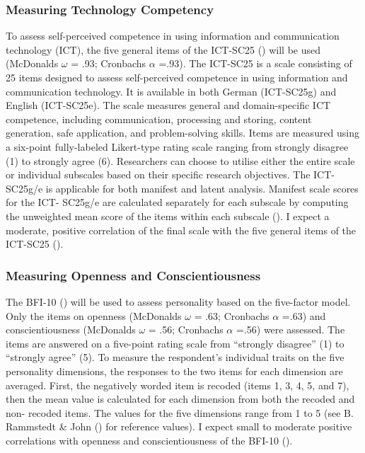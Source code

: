 \documentclass[
  12pt,
  a4paper,
  twoside]{article}
\begin{document}
\subsubsection{Measuring Technology Competency}\label{measuring-technology-competency}

To assess self-perceived competence in using information and
communication technology (ICT), the five general items of the ICT-SC25 () will be used (McDonalds \(\omega\) = .93; Cronbachs \(\alpha\) =.93). The ICT-SC25 is a scale consisting of 25 items designed to
assess self-perceived competence in using information and communication
technology. It is available in both German (ICT-SC25g) and English (ICT-SC25e). The
scale measures general and domain-specific ICT competence, including
communication, processing and storing, content generation, safe application, and
problem-solving skills. Items are measured using a six-point fully-labeled Likert-type
rating scale ranging from strongly disagree (1) to strongly agree (6). Researchers can choose to
utilise either the entire scale or individual subscales based on their specific research objectives. The ICT-SC25g/e
is applicable for both manifest and latent analysis. Manifest scale scores for the ICT-
SC25g/e are calculated separately for each subscale by computing the unweighted
mean score of the items within each subscale (). I expect a moderate, positive correlation of the final scale with the five general items of the ICT-SC25 ().

\subsubsection{Measuring Openness and Conscientiousness}\label{measuring-openness-and-conscientiousness}

The BFI-10 () will be used to assess
personality based on the five-factor model. Only the items on openness (McDonalds \(\omega\) = .63; Cronbachs \(\alpha\) =.63) and conscientiousness (McDonalds \(\omega\) = .56; Cronbachs \(\alpha\) =.56) were assessed.
The items are answered on a five-point rating scale from ``strongly disagree'' (1) to
``strongly agree'' (5). To measure the respondent's individual traits on the five
personality dimensions, the responses to the two items for each dimension are
averaged. First, the negatively worded item is recoded (items 1, 3, 4, 5, and 7), then
the mean value is calculated for each dimension from both the recoded and non-
recoded items. The values for the five dimensions range from 1 to 5 (see
B. Rammstedt \& John () for reference values). I expect small to moderate positive correlations with openness and conscientiousness of the BFI-10 ().
\end{document}
